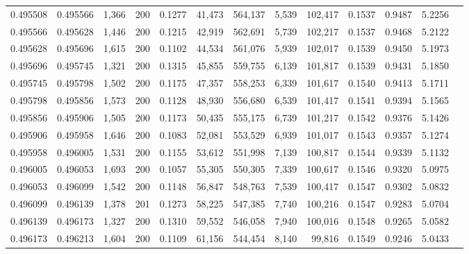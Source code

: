 \begin{tabular}{rrrrrrrrrrrrr}
0.495508 & 0.495566 & 1,366 & 200 &                                     0.1277 &  41,473 & 564,137 &   5,539 & 102,417 & 0.1537 & 0.9487 & 5.2256 \\
0.495566 & 0.495628 & 1,446 & 200 &                                     0.1215 &  42,919 & 562,691 &   5,739 & 102,217 & 0.1537 & 0.9468 & 5.2122 \\
0.495628 & 0.495696 & 1,615 & 200 &                                     0.1102 &  44,534 & 561,076 &   5,939 & 102,017 & 0.1539 & 0.9450 & 5.1973 \\
0.495696 & 0.495745 & 1,321 & 200 &                                     0.1315 &  45,855 & 559,755 &   6,139 & 101,817 & 0.1539 & 0.9431 & 5.1850 \\
0.495745 & 0.495798 & 1,502 & 200 &                                     0.1175 &  47,357 & 558,253 &   6,339 & 101,617 & 0.1540 & 0.9413 & 5.1711 \\
0.495798 & 0.495856 & 1,573 & 200 &                                     0.1128 &  48,930 & 556,680 &   6,539 & 101,417 & 0.1541 & 0.9394 & 5.1565 \\
0.495856 & 0.495906 & 1,505 & 200 &                                     0.1173 &  50,435 & 555,175 &   6,739 & 101,217 & 0.1542 & 0.9376 & 5.1426 \\
0.495906 & 0.495958 & 1,646 & 200 &                                     0.1083 &  52,081 & 553,529 &   6,939 & 101,017 & 0.1543 & 0.9357 & 5.1274 \\
0.495958 & 0.496005 & 1,531 & 200 &                                     0.1155 &  53,612 & 551,998 &   7,139 & 100,817 & 0.1544 & 0.9339 & 5.1132 \\
0.496005 & 0.496053 & 1,693 & 200 &                                     0.1057 &  55,305 & 550,305 &   7,339 & 100,617 & 0.1546 & 0.9320 & 5.0975 \\
0.496053 & 0.496099 & 1,542 & 200 &                                     0.1148 &  56,847 & 548,763 &   7,539 & 100,417 & 0.1547 & 0.9302 & 5.0832 \\
0.496099 & 0.496139 & 1,378 & 201 &                                     0.1273 &  58,225 & 547,385 &   7,740 & 100,216 & 0.1547 & 0.9283 & 5.0704 \\
0.496139 & 0.496173 & 1,327 & 200 &                                     0.1310 &  59,552 & 546,058 &   7,940 & 100,016 & 0.1548 & 0.9265 & 5.0582 \\
0.496173 & 0.496213 & 1,604 & 200 &                                     0.1109 &  61,156 & 544,454 &   8,140 &  99,816 & 0.1549 & 0.9246 & 5.0433 \\

\end{tabular}
